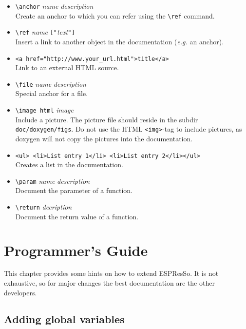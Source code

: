 \documentclass[
a4paper,                        %
11pt,                           %
twoside,                        %
footsepline,                    %
headsepline,                    %
headexclude,                    %
footexclude,                    %
pagesize,                       %
bibtotocnumbered,               %
idxtotoc                        %
]{scrreprt}
\newcommand{\es}{\mbox{\textsf{ESPResSo}}\xspace}
\newcommand{\eg}{\textit{e.g.}\xspace}
\begin{document}
\begin{itemize}
\item \verb!\anchor! \textit{name} \textit{description}\\
  Create an anchor to which you can refer using the \verb!\ref!
  command.
\item \verb!\ref! \textit{name} \texttt{["}\textit{text}\texttt{"]}\\
  Insert a link to another object in the documentation (\eg an
  anchor).
\item \verb!<a href="http://www.your_url.html">title</a>!\\
  Link to an external HTML source.
\item \verb!\file! \textit{name} \textit{description}\\
  Special anchor for a file.
\item \verb!\image html! \textit{image}\\
  Include a picture. The picture file should reside in the subdir
  \verb!doc/doxygen/figs!. Do not use the HTML \verb!<img>!-tag to
  include pictures, as doxygen will not copy the pictures into the
  documentation.
\item \verb!<ul> <li>List entry 1</li> <li>List entry 2</li></ul>!\\
  Creates a list in the documentation.
\item \verb!\param! \textit{name} \textit{description}\\
  Document the parameter of a function.
\item \verb!\return! \textit{decription}\\
  Document the return value of a function.
\end{itemize}

\chapter{Programmer's Guide}

This chapter provides some hints on how to extend \es.  It is not
exhaustive, so for major changes the best documentation are the other
developers.

\section{Adding global variables}
\end{document}
